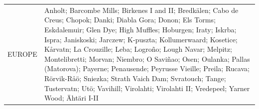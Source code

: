 \documentclass[journal abbreviation, manuscript]{copernicus}
\begin{document}
\begin{table}
\begin{tabularx}{\textwidth}{lX}
  EUROPE   & Anholt; Barcombe Mills; Birkenes I and II; Bredkälen; Cabo de Creus; Chopok; Danki; Diabla Gora; Donon; Els Torms; Eskdalemuir; Glen Dye; High Muffles; Hoburgen; Iraty; Iskrba; Ispra; Janiskoski; Jarczew; K-puszta; Kollumerwaard; Kosetice; Kårvatn; La Crouzille; Leba; Logroño; Lough Navar; Melpitz; Montelibretti; Morvan; Niembro; O Saviñao; Osen; Oulanka; Pallas (Matorova); Payerne; Penausende; Peyrusse Vieille; Preila; Rucava; Rörvik-Råö; Sniezka; Strath Vaich Dam; Svratouch; Tange; Tustervatn; Utö; Vavihill; Virolahti; Virolahti II; Vredepeel; Yarner Wood; Ähtäri I-II                                                                                                                                                                                                                                                                                                                                                                                                                                                                                                                                                                                                                                                                                                                                                                                                                                                                                                                                                                                                                                                                                                                                                                                                                                                                                                                                                                                                                                                                                                                                                                                                                                                                                                                                                                                                                                                                                                                                                                                                                                                                                                                                                                                                                                                                                                                                                                                                                                                                                                                                                                                                                                                                                                                                                                                                            
\end{tabularx}
\end{table}
\end{document}
